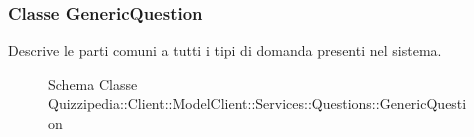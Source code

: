 \subsubsection{Classe GenericQuestion}
Descrive le parti comuni a tutti i tipi di domanda presenti nel sistema.
\begin{figure}[H]
\centering
\noindent{}
\caption[Schema Classe GenericQuestion]{Schema Classe Quizzipedia::Client::ModelClient::Services::Questions::GenericQuestion}
\end{figure}
